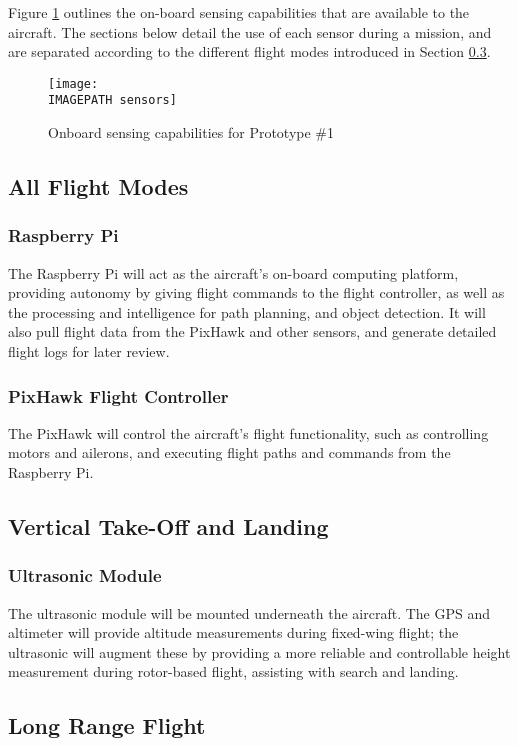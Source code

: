 \label{sec:sensing}
Figure \ref{fig:sensing} outlines the on-board sensing capabilities that are available to the aircraft. The sections below detail the use of each sensor during a mission, and are separated according to the different flight modes introduced in Section \ref{}. 

\begin{figure}[!ht]
	\centering
	\texttt{[image: \\IMAGEPATH sensors]}
	\caption{Onboard sensing capabilities for Prototype \#1}
	\label{fig:sensing}
\end{figure}

\subsection{All Flight Modes}
\subsubsection*{Raspberry Pi}
The Raspberry Pi will act as the aircraft's on-board computing platform, providing autonomy by giving flight commands to the flight controller, as well as the processing and intelligence for path planning, and object detection. It will also pull flight data from the PixHawk and other sensors, and generate detailed flight logs for later review.

\subsubsection*{PixHawk Flight Controller}
The PixHawk will control the aircraft's flight functionality, such as controlling motors and ailerons, and executing flight paths and commands from the Raspberry Pi.

\subsection{Vertical Take-Off and Landing}
\subsubsection*{Ultrasonic Module}
The ultrasonic module will be mounted underneath the aircraft. The GPS and altimeter will provide altitude measurements during fixed-wing flight; the ultrasonic will augment these by providing a more reliable and controllable height measurement during rotor-based flight, assisting with search and landing.

\subsection{Long Range Flight}
